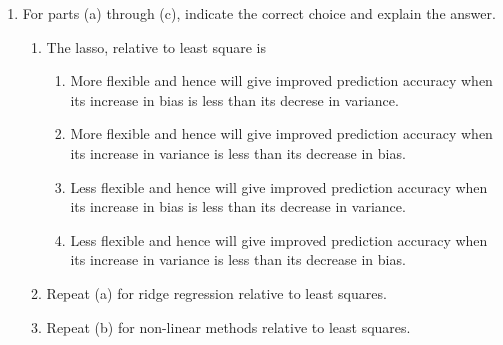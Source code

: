 \documentclass[../statistical_learning_notes.tex]{subfiles}
\begin{document}
\begin{enumerate}
        \item For parts (a) through (c), indicate the correct choice and explain the answer.
        \begin{enumerate}
            \item The lasso, relative to least square is
            \begin{enumerate}
                \item More flexible and hence will give improved prediction accuracy when its increase in bias is less than its decrese in variance.
                \item More flexible and hence will give improved prediction accuracy when its increase in variance is less than its decrease in bias.
                \item Less flexible and hence will give improved prediction accuracy when its increase in bias is less than its decrease in variance.
                \item Less flexible and hence will give improved prediction accuracy when its increase in variance is less than its decrease in bias.
            \end{enumerate}
            \item Repeat (a) for ridge regression relative to least squares.
            \item Repeat (b) for non-linear methods relative to least squares.
        \end{enumerate}
        

\end{enumerate}
\end{document}
